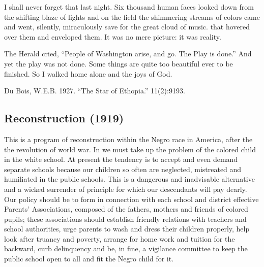 \documentclass[letterpaper,10pt,english]{jupyterBook}
\begin{document}
\sphinxAtStartPar
I shall never forget that last night. Six thousand human faces looked down from the shifting blaze of lights and on the field the shimmering streams of colors came and went, silently, miraculously save for the great cloud of music. that hovered over them and enveloped them. It was no mere picture: it was reality.

\sphinxAtStartPar
The Herald cried, “People of Washington arise, and go. The Play is done.” And yet the play was not done. Some things are quite too beautiful ever to be finished. So I walked home alone and
the joys of God.

\sphinxAtStartPar
{} Du Bois, W.E.B. 1927. “The Star of Ethopia.” 11(2):91\sphinxhyphen{}93.


\subsection{Reconstruction (1919)}
\label{\detokenize{Volumes/18/03/reconstruction:reconstruction-1919}}\label{\detokenize{Volumes/18/03/reconstruction::doc}}
\sphinxAtStartPar
This is a program of reconstruction within the Negro race in America, after the the revolution of world war. In  we must take up the problem of the colored child in the white school. At present the tendency is to accept and even demand separate schools because our children so often are neglected, mistreated and humiliated in the public schools. This is a dangerous and inadvisable alternative and a wicked surrender of principle for which our descendants will pay dearly. Our policy should be to form in connection with each school and district effective Parents’ Associations, composed of the fathers, mothers and friends of colored pupils; these associations should establish friendly relations with teachers and school authorities, urge parents to wash and dress their children properly, help look after truancy and poverty, arrange for home work and tuition for the backward, curb delinquency and be, in fine, a vigilance committee to keep the public school open to all and fit the Negro child for it.
\end{document}
